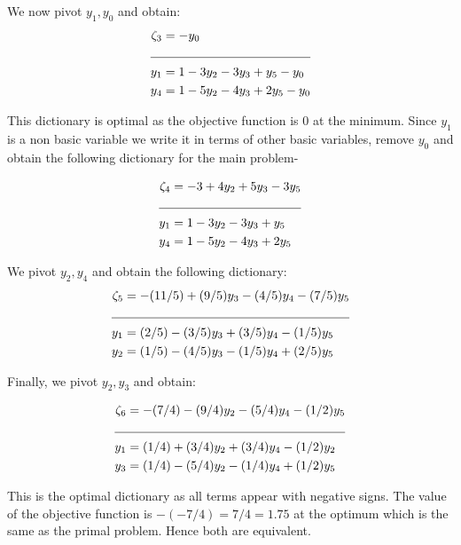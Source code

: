 \documentclass[letterpaper,12pt]{article}
\theoremstyle{definition}
\begin{document}
We now pivot $y_1, y_0$ and obtain:
\begin{align*}
  \zeta_3 &= -y_0\\
  \cline{1-2}
  y_1 &= 1-3y_2-3y_3+y_5-y_0\\
  y_4 &= 1-5y_2-4y_3+2y_5-y_0\\
\end{align*}

This dictionary is optimal as the objective function is 0 at the minimum. Since $y_1$ is a non basic variable
we write it in terms of other basic variables, remove $y_0$ and obtain the following dictionary for the main problem-

\begin{align*}
  \zeta_4 &= -3+4y_2+5y_3-3y_5\\
  \cline{1-2}
  y_1 &= 1-3y_2-3y_3+y_5\\
  y_4 &= 1-5y_2-4y_3+2y_5\\
\end{align*}

We pivot $y_2, y_4$ and obtain the following dictionary:
\begin{align*}
  \zeta_5 &= -(11/5)+(9/5)y_3-(4/5)y_4- (7/5)y_5\\
  \cline{1-2}
  y_1 &= (2/5)-(3/5)y_3+(3/5)y_4-(1/5)y_5\\
  y_2 &= (1/5)-(4/5)y_3-(1/5)y_4+(2/5)y_5\\
\end{align*}

Finally, we pivot $y_2, y_3$ and obtain:

\begin{align*}
  \zeta_6 &= -(7/4)-(9/4)y_2-(5/4)y_4-(1/2)y_5\\
  \cline{1-2}
  y_1 &= (1/4)+(3/4)y_2+(3/4)y_4-(1/2)y_2\\
  y_3 &= (1/4)- (5/4)y_2-(1/4)y_4+(1/2)y_5\\
\end{align*}

This is the optimal dictionary as all terms appear with negative signs. The value of the objective function is $-(-7/4) = 7/4= 1.75$
at the optimum which is the same as the primal problem. Hence both are equivalent.
\end{document}
